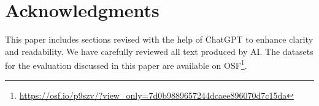 \documentclass[sigconf,screen,review,anonymous]{acmart}
\begin{document}
\appendix

\section{Acknowledgments}
This paper includes sections revised with the help of ChatGPT to enhance clarity and readability.
We have carefully reviewed all text produced by AI.
The datasets for the evaluation discussed in this paper are available on OSF\footnote{\url{https://osf.io/p9szv/?view_only=7d0b9889657244dcaee896070d7c15da}}.

\newpage
\balance


\end{document}
